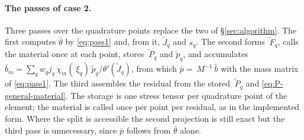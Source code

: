 \documentclass[11pt]{article}
\newcommand{\F}{~F}
\renewcommand{\P}{~P}
\theoremstyle{definition}
\theoremstyle{plain}
\begin{document}
\paragraph{The passes of case 2.} Three passes over the quadrature points
replace the two of \S\ref{sec:algorithm}. The first computes $\bar\theta$
by \eqref{eq:pass1} and, from it, $\tilde J_q$ and $s_q$. The second forms
$\tilde{\F}_q$, calls the material once at each point, stores
$\tilde{\P}_q$ and $\tilde p_q$, and accumulates $\bar b_m = \sum_q w_q
j_q\, \chi_m(~\xi_q)\, \tilde p_q / \theta'(\tilde J_q)$, from which $\bar p
= ~M^{-1}\bar{~b}$ with the mass matrix of \eqref{eq:pass1}. The third
assembles the residual from the stored $\tilde{\P}_q$ and
\eqref{eq:P-general-material}. The storage is one stress tensor per
quadrature point of the element; the material is called once per point per
residual, as in the implemented form. Where the split is accessible the
second projection is still exact but the third pass is unnecessary, since
$\bar p$ follows from $\bar\theta$ alone.
\end{document}
